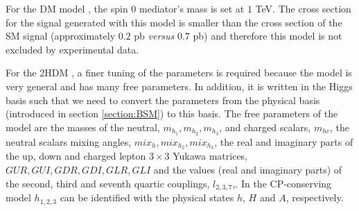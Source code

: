 
For the DM model \cite{DM}, the spin 0 mediator's mass is set at $1$ TeV. The cross section for the signal generated with this model is smaller than the cross section of the SM signal (approximately $0.2$ pb \textit{versus} $0.7$ pb) and therefore this model is not excluded by experimental data.

For the 2HDM \cite{2HDM,2HDM1}, a finer tuning of the parameters is required because the model is very general and has many free parameters. In addition, it is written in the Higgs basis such that we need to convert the parameters from the physical basis (introduced in section \ref{section:BSM}) to this basis. The free parameters of the model are the masses of the neutral, $m_{h_1}, m_{h_2}, m_{h_3}$, and charged scalars, $m_{hc}$, the neutral scalars mixing angles, $mix_h, mix_{h_2}, mix_{h_3}$, the real and imaginary parts of the up, down and charged lepton $3\times 3$ Yukawa matrices, $GUR, GUI, GDR, GDI, GLR, GLI$ and the values (real and imaginary parts) of the second, third and seventh quartic couplings, $l_{2,3,7}$,. In the CP-conserving model $h_{1,2,3}$ can be identified with the physical states $h$, $H$ and $A$, respectively.

